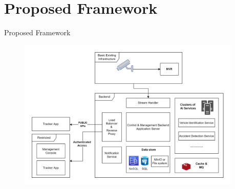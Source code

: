 \documentclass{beamer}
\begin{document}
\section{Proposed Framework}
\begin{frame}{Proposed Framework}
	\begin{figure}
		\includegraphics[width=0.95\textwidth]{res/architecture_high_level.png}
	\end{figure}
\end{frame}

\end{document}
